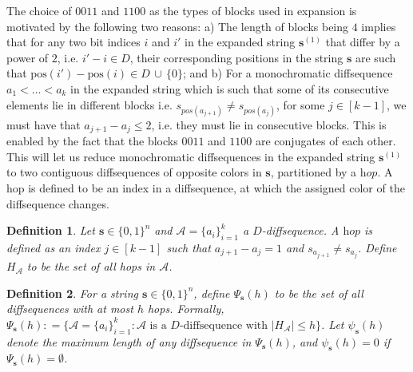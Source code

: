 \documentclass[10pt,a4paper]{amsart}
\newtheorem{ex}{Example}
\newtheorem{definition}{Definition}
\begin{document}

The choice of $0011$ and $1100$ as the types of blocks used in expansion is motivated by the following two reasons: a) The length of blocks being $4$ implies that for any two bit indices $i$ and $i'$ in the expanded string $\mathbf{s}^{(1)}$ that differ by a power of $2$, i.e. $i'-i \in D$, their corresponding positions in the string $\mathbf{s}$ are such that $\mathrm{pos}(i') - \mathrm{pos}(i) \in D \, \cup \, \{0\}$; and b) For a monochromatic diffsequence $a_1< \ldots < a_k$ in the expanded string which is such that some of its consecutive elements lie in different blocks i.e. $s_{pos(a_{j+1})} \neq s_{pos(a_{j})}$, for some $j \in [k-1]$, we must have that $a_{j+1} - a_{j} \le 2$, i.e. they must lie in consecutive blocks. This is enabled by the fact that the blocks $0011$ and $1100$ are conjugates of each other. This will let us reduce monochromatic diffsequences in the expanded string $\mathbf{s}^{(1)}$ to two contiguous diffsequences of opposite colors in $\mathbf{s}$, partitioned by a $\textit{hop}$. A hop is defined to be an index in a diffsequence, at which the assigned color of the diffsequence changes.

\begin{definition}\label{def: hops}
Let $\mathbf{s} \in \{ 0,1 \}^n$ and $\mathcal{A}=\{a_i\}_{i=1}^k$ a $D$-diffsequence. A $\textit{hop}$ is defined as an index $j \in [k-1]$ such that $a_{j+1}-a_j=1$ and $s_{a_{j+1}}\neq s_{a_{j}}$. Define $H_{\mathcal{A}}$ to be the set of all hops in $\mathcal{A}$.
\end{definition}

\begin{definition}\label{def: Psi_psi}
For a string $\mathbf{s} \in \{ 0,1 \}^n$, define $\Psi_{\mathbf{s}}(h)$ to be the set of all diffsequences with at most $h$ hops. Formally, $ \Psi_{\mathbf{s}}(h): =\{\mathcal{A}=\{a_i\}_{i=1}^k 
    :\mathcal{A} \text{ is a } D\text{-diffsequence with } |H_{\mathcal{A}}|\le h\}$. Let $\psi_\mathbf{s}(h)$ denote the maximum length of any diffsequence in $\Psi_{\mathbf{s}}(h)$, and $\psi_\mathbf{s}(h) = 0$ if $\Psi_{\mathbf{s}}(h) = \emptyset$.
\end{definition}
\end{document}
